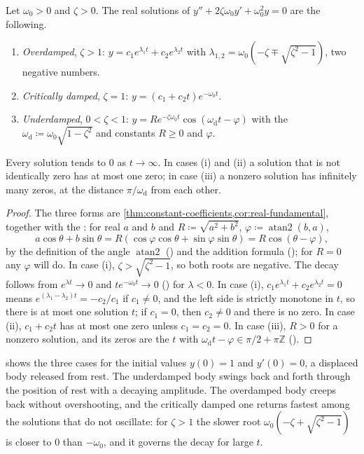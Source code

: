 \begin{proposition}
\label{prop:free-oscillations}
Let $\omega_0>0$ and $\zeta>0$. The real solutions of $y''+2\zeta\omega_0y'+\omega_0^2y=0$ are the following.
\begin{enumerate}
\item \emph{Overdamped}, $\zeta>1$: $y=c_1e^{\lambda_1t}+c_2e^{\lambda_2t}$ with $\lambda_{1,2}=\omega_0(-\zeta\mp\sqrt{\zeta^2-1})$, two negative numbers.
\item \emph{Critically damped}, $\zeta=1$: $y=(c_1+c_2t)e^{-\omega_0t}$.
\item \emph{Underdamped}, $0<\zeta<1$: $y=Re^{-\zeta\omega_0t}\cos(\omega_{\mathrm d}t-\varphi)$ with the  $\omega_{\mathrm d}\coloneqq\omega_0\sqrt{1-\zeta^2}$ and constants $R\ge0$ and $\varphi$.
\end{enumerate}
Every solution tends to $0$ as $t\to\infty$. In cases (i) and (ii) a solution that is not identically zero has at most one zero; in case (iii) a nonzero solution has infinitely many zeros, at the distance $\pi/\omega_{\mathrm d}$ from each other.
\end{proposition}

\begin{proof}
The three forms are \cref{thm:constant-coefficients,cor:real-fundamental}, together with the : for real $a$ and $b$ and $R\coloneqq\sqrt{a^2+b^2}$, $\varphi\coloneqq\operatorname{atan2}(b,a)$,
\[
a\cos\theta+b\sin\theta=R(\cos\varphi\cos\theta+\sin\varphi\sin\theta)=R\cos(\theta-\varphi),
\]
by the definition of the angle $\operatorname{atan2}$ () and the addition formula (); for $R=0$ any $\varphi$ will do. In case (i), $\zeta>\sqrt{\zeta^2-1}$, so both roots are negative. The decay follows from $e^{\lambda t}\to0$ and $te^{-\omega_0t}\to0$ () for $\lambda<0$. In case (i), $c_1e^{\lambda_1t}+c_2e^{\lambda_2t}=0$ means $e^{(\lambda_1-\lambda_2)t}=-c_2/c_1$ if $c_1\ne0$, and the left side is strictly monotone in $t$, so there is at most one solution $t$; if $c_1=0$, then $c_2\ne0$ and there is no zero. In case (ii), $c_1+c_2t$ has at most one zero unless $c_1=c_2=0$. In case (iii), $R>0$ for a nonzero solution, and its zeros are the $t$ with $\omega_{\mathrm d}t-\varphi\in\pi/2+\pi\mathbb Z$ ().
\end{proof}

 shows the three cases for the initial values $y(0)=1$ and $y'(0)=0$, a displaced body released from rest. The underdamped body swings back and forth through the position of rest with a decaying amplitude. The overdamped body creeps back without overshooting, and the critically damped one returns fastest among the solutions that do not oscillate: for $\zeta>1$ the slower root $\omega_0(-\zeta+\sqrt{\zeta^2-1})$ is closer to $0$ than $-\omega_0$, and it governs the decay for large $t$.

